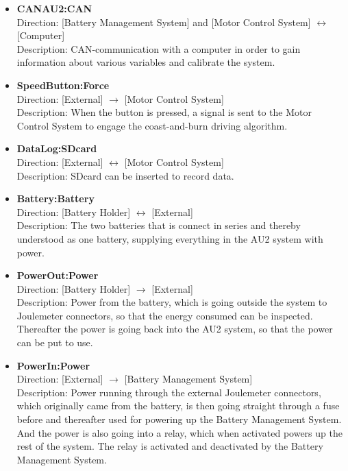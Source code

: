 \begin{itemize}
	\item \textbf{CANAU2:CAN}\\
	Direction: [Battery Management System] and [Motor Control System] $\leftrightarrow$ [Computer]\\
	Description: CAN-communication with a computer in order to gain information about various variables and calibrate the system.
	\item \textbf{SpeedButton:Force}\\
	Direction: [External] $\rightarrow$ [Motor Control System]\\
	Description: When the button is pressed, a signal is sent to the Motor Control System to engage the coast-and-burn driving algorithm.
	\item \textbf{DataLog:SDcard}\\
	Direction: [External] $\leftrightarrow$ [Motor Control System]\\
	Description: SDcard can be inserted to record data.
	\item \textbf{Battery:Battery}\\
	Direction: [Battery Holder] $\leftrightarrow$ [External]\\
	Description: The two batteries that is connect in series and thereby understood as one battery, supplying everything in the AU2 system with power.
	\item \textbf{PowerOut:Power}\\
	Direction: [Battery Holder] $\rightarrow$ [External]\\
	Description: Power from the battery, which is going outside the system to Joulemeter connectors, so that the energy consumed can be inspected. Thereafter the power is going back into the AU2 system, so that the power can be put to use.
	\item \textbf{PowerIn:Power}\\
	Direction: [External] $\rightarrow$ [Battery Management System]\\
	Description: Power running through the external Joulemeter connectors, which originally came from the battery, is then going straight through a fuse before and thereafter used for powering up the Battery Management System. And the power is also going into a relay, which when activated powers up the rest of the system. The relay is activated and deactivated by the Battery Management System.
\end{itemize}

